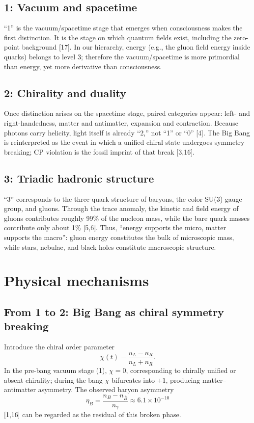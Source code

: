 \documentclass[11pt,a4paper]{article}
\begin{document}
\subsection{1: Vacuum and spacetime}
``1'' is the vacuum/spacetime stage that emerges when consciousness makes the first distinction. It is the stage on which quantum fields exist, including the zero-point background [17]. In our hierarchy, energy (e.g., the gluon field energy inside quarks) belongs to level 3; therefore the vacuum/spacetime is more primordial than energy, yet more derivative than consciousness.

\subsection{2: Chirality and duality}
Once distinction arises on the spacetime stage, paired categories appear: left- and right-handedness, matter and antimatter, expansion and contraction. Because photons carry helicity, light itself is already ``2,'' not ``1'' or ``0'' [4]. The Big Bang is reinterpreted as the event in which a unified chiral state undergoes symmetry breaking; CP violation is the fossil imprint of that break [3,16].

\subsection{3: Triadic hadronic structure}
``3'' corresponds to the three-quark structure of baryons, the color SU(3) gauge group, and gluons. Through the trace anomaly, the kinetic and field energy of gluons contributes roughly 99\% of the nucleon mass, while the bare quark masses contribute only about 1\% [5,6]. Thus, ``energy supports the micro, matter supports the macro'': gluon energy constitutes the bulk of microscopic mass, while stars, nebulae, and black holes constitute macroscopic structure.

\section{Physical mechanisms}

\subsection{From 1 to 2: Big Bang as chiral symmetry breaking}
Introduce the chiral order parameter
\begin{equation}
\chi(t)=\frac{n_L-n_R}{n_L+n_R}.
\end{equation}
In the pre-bang vacuum stage (1), $\chi=0$, corresponding to chirally unified or absent chirality; during the bang $\chi$ bifurcates into $\pm1$, producing matter--antimatter asymmetry. The observed baryon asymmetry
\begin{equation}
\eta_B=\frac{n_B-n_{\bar B}}{n_\gamma}\approx 6.1\times10^{-10}
\end{equation}
[1,16] can be regarded as the residual of this broken phase.
\end{document}
